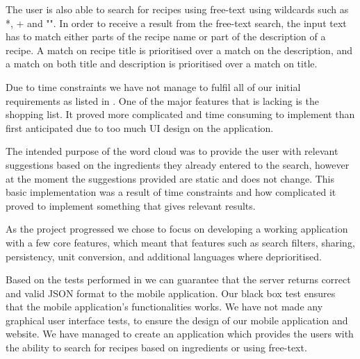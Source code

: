 The user is also able to search for recipes using free-text using wildcards such as *, + and "". In order to receive a result from the free-text search, the input text has to match either parts of the recipe name or part of the description of a recipe. A match on recipe title is prioritised over a match on the description, and a match on both title and description is prioritised over a match on title.

Due to time constraints we have not manage to fulfil all of our initial requirements as listed in . One of the major features that is lacking is the shopping list. It proved more complicated and time consuming to implement than first anticipated due to too much UI design on the application.

The intended purpose of the word cloud was to provide the user with relevant suggestions based on the ingredients they already entered to the search, however at the moment the suggestions provided are static and does not change. This basic implementation was a result of time constraints and how complicated it proved to implement something that gives relevant results. 

As the project progressed we chose to focus on developing a working application with a few core features, which meant that features such as search filters, sharing, persistency, unit conversion, and additional languages where deprioritised. 

Based on the tests performed in  we can guarantee that the server returns correct and valid JSON format to the mobile application. Our black box test ensures that the mobile application's functionalities works. We have not made any graphical user interface tests, to ensure the design of our mobile application and website. We have managed to create an application which provides the users with the ability to search for recipes based on ingredients or using free-text.